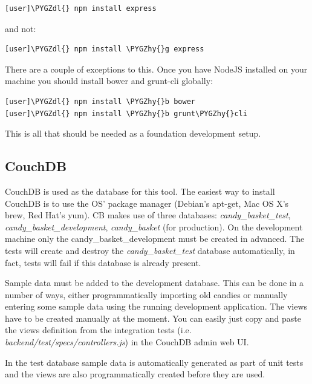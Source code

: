 \documentclass[letterpaper,10pt,english]{sphinxmanual}
\def\PYGZdl{\char`\$}
\def\PYGZhy{\char`\-}
\begin{document}
\begin{Verbatim}[commandchars=\\\{\}]
[user]\PYGZdl{} npm install express
\end{Verbatim}

and not:

\begin{Verbatim}[commandchars=\\\{\}]
[user]\PYGZdl{} npm install \PYGZhy{}g express
\end{Verbatim}

There are a couple of exceptions to this. Once you have NodeJS
installed on your machine you should install bower and grunt-cli
globally:

\begin{Verbatim}[commandchars=\\\{\}]
[user]\PYGZdl{} npm install \PYGZhy{}b bower
[user]\PYGZdl{} npm install \PYGZhy{}b grunt\PYGZhy{}cli
\end{Verbatim}

This is all that should be needed as a foundation development setup.


\subsection{CouchDB}
\label{developer-guide:couchdb}\label{developer-guide:id1}
CouchDB is used as the database for this tool. The easiest way to
install CouchDB is to use the OS' package manager (Debian's apt-get,
Mac OS X's brew, Red Hat's yum). CB makes use of three databases:
\emph{candy\_basket\_test}, \emph{candy\_basket\_development}, \emph{candy\_basket} (for
production). On the development machine only the
candy\_basket\_development must be created in advanced. The tests will
create and destroy the \emph{candy\_basket\_test} database automatically, in
fact, tests will fail if this database is already present.

Sample data must be added to the development database. This can be
done in a number of ways, either programmatically importing old
candies or manually entering some sample data using the running
development application. The views have to be created manually at the
moment. You can easily just copy and paste the views definition from
the integration tests (i.e. \emph{backend/test/specs/controllers.js}) in
the CouchDB admin web UI.

In the test database sample data is automatically generated as part of
unit tests and the views are also programmatically created before they
are used.
\end{document}

